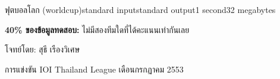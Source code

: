 \documentclass[11pt,a4paper]{article}
\begin{document}
\begin{problem}{ฟุตบอลโลก (worldcup)}{standard input}{standard output}{1 second}{32 megabytes}
\begin{example}
%
%
\end{example}

\Scoring

\textbf{40\% ของข้อมูลทดสอบ:} ไม่มีสองทีมใดที่ได้คะแนนเท่ากันเลย


\Source

โจทย์โดย: สุธี เรืองวิเศษ

การแข่งขัน IOI Thailand League เดือนกรกฏาคม 2553


\end{problem}
\end{document}

